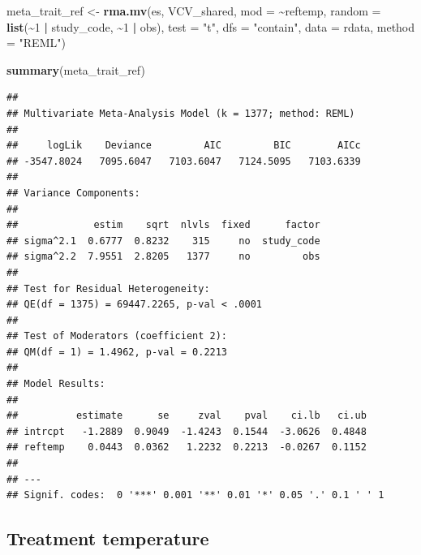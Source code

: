 \documentclass[
]{article}
\newenvironment{Shaded}{\begin{snugshade}}{\end{snugshade}}
\newcommand{\AttributeTok}[1]{\textcolor[rgb]{0.13,0.29,0.53}{#1}}
\newcommand{\DecValTok}[1]{\textcolor[rgb]{0.00,0.00,0.81}{#1}}
\newcommand{\FunctionTok}[1]{\textcolor[rgb]{0.13,0.29,0.53}{\textbf{#1}}}
\newcommand{\NormalTok}[1]{#1}
\newcommand{\OtherTok}[1]{\textcolor[rgb]{0.56,0.35,0.01}{#1}}
\newcommand{\SpecialCharTok}[1]{\textcolor[rgb]{0.81,0.36,0.00}{\textbf{#1}}}
\newcommand{\StringTok}[1]{\textcolor[rgb]{0.31,0.60,0.02}{#1}}
\begin{document}
\begin{Shaded}
\begin{Highlighting}[]
\NormalTok{meta\_trait\_ref }\OtherTok{\textless{}{-}} \FunctionTok{rma.mv}\NormalTok{(es, VCV\_shared, }\AttributeTok{mod =} \SpecialCharTok{\textasciitilde{}}\NormalTok{reftemp, }\AttributeTok{random =} \FunctionTok{list}\NormalTok{(}\SpecialCharTok{\textasciitilde{}}\DecValTok{1} \SpecialCharTok{|}
\NormalTok{    study\_code, }\SpecialCharTok{\textasciitilde{}}\DecValTok{1} \SpecialCharTok{|}\NormalTok{ obs), }\AttributeTok{test =} \StringTok{"t"}\NormalTok{, }\AttributeTok{dfs =} \StringTok{"contain"}\NormalTok{, }\AttributeTok{data =}\NormalTok{ rdata,}
    \AttributeTok{method =} \StringTok{"REML"}\NormalTok{)}
\end{Highlighting}
\end{Shaded}

\begin{Shaded}
\begin{Highlighting}[]
\FunctionTok{summary}\NormalTok{(meta\_trait\_ref)}
\end{Highlighting}
\end{Shaded}

\begin{verbatim}
## 
## Multivariate Meta-Analysis Model (k = 1377; method: REML)
## 
##     logLik    Deviance         AIC         BIC        AICc   
## -3547.8024   7095.6047   7103.6047   7124.5095   7103.6339   
## 
## Variance Components:
## 
##             estim    sqrt  nlvls  fixed      factor 
## sigma^2.1  0.6777  0.8232    315     no  study_code 
## sigma^2.2  7.9551  2.8205   1377     no         obs 
## 
## Test for Residual Heterogeneity:
## QE(df = 1375) = 69447.2265, p-val < .0001
## 
## Test of Moderators (coefficient 2):
## QM(df = 1) = 1.4962, p-val = 0.2213
## 
## Model Results:
## 
##          estimate      se     zval    pval    ci.lb   ci.ub    
## intrcpt   -1.2889  0.9049  -1.4243  0.1544  -3.0626  0.4848    
## reftemp    0.0443  0.0362   1.2232  0.2213  -0.0267  0.1152    
## 
## ---
## Signif. codes:  0 '***' 0.001 '**' 0.01 '*' 0.05 '.' 0.1 ' ' 1
\end{verbatim}

\newpage

\hypertarget{treatment-temperature}{%
\subsection{Treatment temperature}\label{treatment-temperature}}
\end{document}
